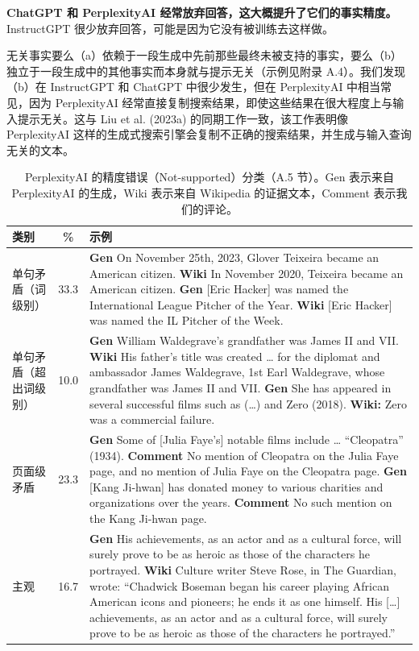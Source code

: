 \documentclass[11pt,UTF8,fontset=fandol]{ctexart}
\begin{document}
\textbf{ChatGPT 和 PerplexityAI 经常放弃回答，这大概提升了它们的事实精度。} InstructGPT 很少放弃回答，可能是因为它没有被训练去这样做。

无关事实要么（a）依赖于一段生成中先前那些最终未被支持的事实，要么（b）独立于一段生成中的其他事实而本身就与提示无关（示例见附录 A.4）。我们发现（b）在 InstructGPT 和 ChatGPT 中很少发生，但在 PerplexityAI 中相当常见，因为 PerplexityAI 经常直接复制搜索结果，即使这些结果在很大程度上与输入提示无关。这与 Liu et al. (2023a) 的同期工作一致，该工作表明像 PerplexityAI 这样的生成式搜索引擎会复制不正确的搜索结果，并生成与输入查询无关的文本。

\begin{table}[H]\centering
\caption{PerplexityAI 的精度错误（Not-supported）分类（A.5 节）。Gen 表示来自 PerplexityAI 的生成，Wiki 表示来自 Wikipedia 的证据文本，Comment 表示我们的评论。}
\label{tab:2}
\small
\renewcommand{\arraystretch}{1.25}
\begin{tabular}{p{3.0cm}c p{10cm}}
\toprule
类别 & \% & 示例 \\
\midrule
单句矛盾（词级别） & 33.3 &
\textbf{Gen} On November 25th, 2023, Glover Teixeira became an American citizen. \textbf{Wiki} In November 2020, Teixeira became an American citizen. \newline
\textbf{Gen} [Eric Hacker] was named the International League Pitcher of the Year. \textbf{Wiki} [Eric Hacker] was named the IL Pitcher of the Week. \\
单句矛盾（超出词级别） & 10.0 &
\textbf{Gen} William Waldegrave's grandfather was James II and VII. \textbf{Wiki} His father's title was created \ldots{} for the diplomat and ambassador James Waldegrave, 1st Earl Waldegrave, whose grandfather was James II and VII. \newline
\textbf{Gen} She has appeared in several successful films such as (\ldots) and Zero (2018). \textbf{Wiki:} Zero was a commercial failure. \\
页面级矛盾 & 23.3 &
\textbf{Gen} Some of [Julia Faye's] notable films include \ldots{} ``Cleopatra'' (1934). \textbf{Comment} No mention of Cleopatra on the Julia Faye page, and no mention of Julia Faye on the Cleopatra page. \newline
\textbf{Gen} [Kang Ji-hwan] has donated money to various charities and organizations over the years. \textbf{Comment} No such mention on the Kang Ji-hwan page. \\
主观 & 16.7 &
\textbf{Gen} His achievements, as an actor and as a cultural force, will surely prove to be as heroic as those of the characters he portrayed. \textbf{Wiki} Culture writer Steve Rose, in The Guardian, wrote: ``Chadwick Boseman began his career playing African American icons and pioneers; he ends it as one himself. His [\ldots] achievements, as an actor and as a cultural force, will surely prove to be as heroic as those of the characters he portrayed.'' \\

\end{tabular}
\end{table}
\end{document}
